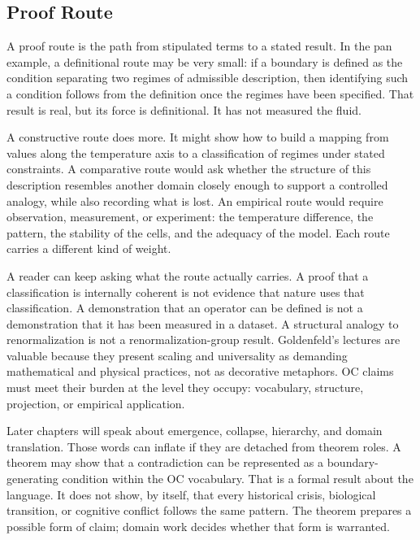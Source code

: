 \documentclass[11pt,a4paper,openany]{book}
\begin{document}
\subsection{Proof Route}
A proof route is the path from stipulated terms to a stated result. In the pan example, a definitional route may be very small: if a boundary is defined as the condition separating two regimes of admissible description, then identifying such a condition follows from the definition once the regimes have been specified. That result is real, but its force is definitional. It has not measured the fluid. \cite{goldenfeld_lectures,kadanoff_scaling}\par
A constructive route does more. It might show how to build a mapping from values along the temperature axis to a classification of regimes under stated constraints. A comparative route would ask whether the structure of this description resembles another domain closely enough to support a controlled analogy, while also recording what is lost. An empirical route would require observation, measurement, or experiment: the temperature difference, the pattern, the stability of the cells, and the adequacy of the model. Each route carries a different kind of weight.\par
A reader can keep asking what the route actually carries. A proof that a classification is internally coherent is not evidence that nature uses that classification. A demonstration that an operator can be defined is not a demonstration that it has been measured in a dataset. A structural analogy to renormalization is not a renormalization-group result. Goldenfeld's lectures are valuable because they present scaling and universality as demanding mathematical and physical practices, not as decorative metaphors. OC claims must meet their burden at the level they occupy: vocabulary, structure, projection, or empirical application.\par
Later chapters will speak about emergence, collapse, hierarchy, and domain translation. Those words can inflate if they are detached from theorem roles. A theorem may show that a contradiction can be represented as a boundary-generating condition within the OC vocabulary. That is a formal result about the language. It does not show, by itself, that every historical crisis, biological transition, or cognitive conflict follows the same pattern. The theorem prepares a possible form of claim; domain work decides whether that form is warranted.\par
\end{document}
